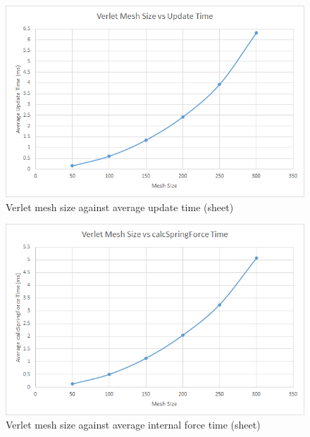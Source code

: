     \begin{figure}
    \begin{center}
      \includegraphics[scale=.9]{Figures/sheet_v_m_ut}
    \end{center}
    \caption{Verlet mesh size against average update time (sheet)}
    \label{fig:v mesh update sheet}
  \end{figure}
  
    \begin{figure}
    \begin{center}
      \includegraphics[scale=.9]{Figures/sheet_v_m_csf}
    \end{center}
    \caption{Verlet mesh size against average internal force time (sheet)}
    \label{fig:v mesh csf sheet}
  \end{figure}
  
